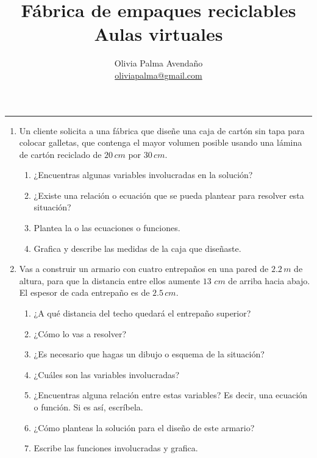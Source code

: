 \documentclass[letterpaper,11pt]{article}
\title{Fábrica de empaques reciclables\\
Aulas virtuales}
\author{Olivia Palma Avendaño \\ \href{mailto:
oliviapalma@gmail.com}{oliviapalma@gmail.com}
}
\date{}
\begin{document}
\maketitle


\begin{center}


	
	\begin{center}\rule{0.9\textwidth}{0.1mm} \end{center}

  
\end{center}

\begin{enumerate}

\item Un cliente solicita a una fábrica que diseñe una caja de cartón sin tapa para colocar galletas, que contenga el mayor volumen posible usando una lámina de cartón reciclado de $20\,cm$ por $30\,cm$.

    \begin{enumerate}
        \item ¿Encuentras algunas variables involucradas en la solución?
        \item ¿Existe una relación o ecuación que se pueda plantear para resolver esta situación?
        \item Plantea la o las ecuaciones o funciones.
        \item Grafica y describe las medidas de la caja que diseñaste.
    \end{enumerate}
    
\item  Vas a construir un armario con cuatro entrepaños en una pared de $2.2\,m$ de altura, para que la distancia entre ellos aumente $13$ $cm$ de arriba hacia abajo. El espesor de cada entrepaño es de $2.5\,cm$.

    \begin{enumerate}
        \item ¿A qué distancia del techo quedará el entrepaño superior?
        \item ¿Cómo lo vas a resolver?
        \item ¿Es necesario que hagas un dibujo o esquema de la situación?
        \item ¿Cuáles son las variables involucradas?
        \item ¿Encuentras alguna relación entre estas variables? Es decir, una ecuación o función. Si es así, escríbela.
        \item ¿Cómo planteas la solución para el diseño de este armario?
        \item  Escribe las funciones involucradas y grafica.
    \end{enumerate}
    

\end{enumerate}
\end{document}
